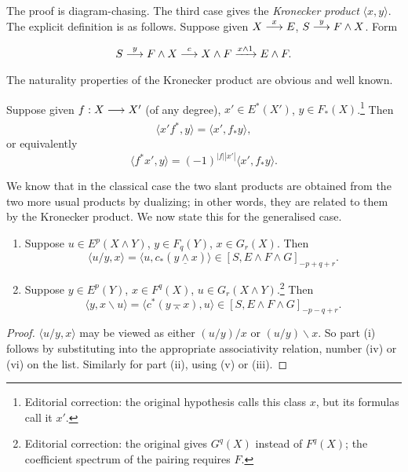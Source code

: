\documentclass[../main]{subfiles}
\begin{document}
The proof is diagram-chasing. The third case gives the \emph{Kronecker product}  $\langle x, y\rangle$. The explicit definition is as follows. Suppose given $X \lar{x} E$, $S \lar{y} F \wedge X$. Form \[S \lar{y} F \wedge X \lar{c} X \wedge F \lar{x \wedge 1} E \wedge F.\] The naturality properties of the Kronecker product are obvious and well known. 

\begin{proposition}\label{prop:p3ch09.6}
Suppose given $f : X \lar{} X'$ (of any degree), $x' \in E^\ast(X')$, $y \in F_\ast(X)$.\footnote{Editorial correction: the original hypothesis calls this class $x$, but its formulas call it $x'$.} Then \[\langle x'f^\ast, y\rangle = \langle x', f_\ast y\rangle,\] or equivalently \[\langle f^\ast x', y\rangle = (-1)^{|f| |x'|} \langle x', f_\ast y\rangle.\]
\end{proposition}

We know that in the classical case the two slant products are obtained from the two more usual products by dualizing; in other words, they are related to them by the Kronecker product. We now state this for the generalised case.

\begin{proposition}\label{prop:p3ch09.7}
\begin{enumerate}
    \item[(i)] Suppose $u \in E^p(X \wedge Y)$, $y \in F_q(Y)$, $x \in G_r(X)$. Then \[\langle u/y, x\rangle = \langle u, c_\ast(y \underline \wedge x)\rangle \in [S, E \wedge F \wedge G]_{-p + q + r}.\]
    \item[(ii)] Suppose $y \in E^p(Y)$, $x \in F^q(X)$, $u \in G_r(X \wedge Y)$.\footnote{Editorial correction: the original gives $G^q(X)$ instead of $F^q(X)$; the coefficient spectrum of the pairing requires $F$.} Then \[\langle y, x \backslash u\rangle = \langle c^\ast(y \barwedge x), u\rangle \in [S, E \wedge F \wedge G]_{-p - q + r}.\]
\end{enumerate}
\end{proposition}

\begin{proof}
$\langle u/y, x\rangle$ may be viewed as either $(u/y)/x$ or $(u/y) \backslash x$. So part (i) follows by substituting into the appropriate associativity relation, number (iv) or (vi) on the list. Similarly for part (ii), using (v) or (iii). 
\end{proof}
\end{document}
